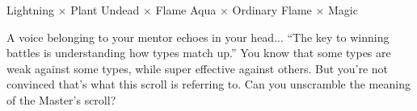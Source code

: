 \begin{center}
\begin{tikzpicture}[x=1.3em,y=1.4em]
\end{tikzpicture}

Lightning \(\times\) Plant \hfill
Undead \(\times\) Flame \hfill
Aqua \(\times\) Ordinary \hfill
Flame \(\times\) Magic
\end{center}

A voice belonging to your mentor echoes in your head...
``The key to winning \mappMobidash{} battles is understanding how types match up.''
You know that some \mappMobidot{} types are weak against some types, while
super effective against others. But you're not convinced that's what this scroll
is referring to. Can you unscramble the meaning of the \mappMobidot{} Master's scroll?


